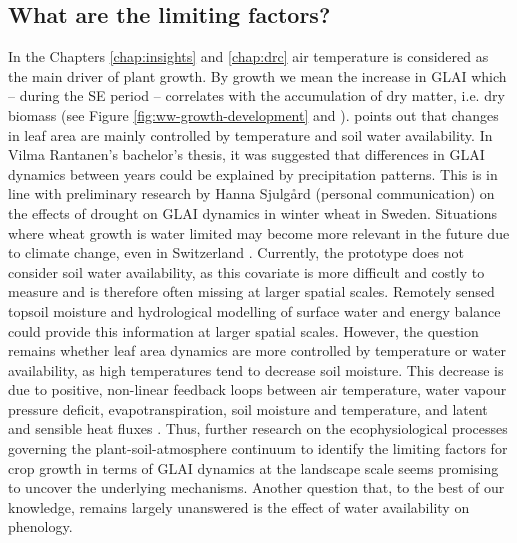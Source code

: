 \subsection{What are the limiting factors?}
In the Chapters \ref{chap:insights} and \ref{chap:drc} air temperature is considered as the main driver of plant growth. By growth we mean the increase in \gls{GLAI} which -- during the \gls{SE} period -- correlates with the accumulation of dry matter, i.e. dry biomass (see Figure \ref{fig:ww-growth-development} and \cite{aase_relationship_1978}). \cite{monteith_climate_1977} points out that changes in leaf area are mainly controlled by temperature and soil water availability. In Vilma Rantanen's bachelor's thesis, it was suggested that differences in \gls{GLAI} dynamics between years could be explained by precipitation patterns. This is in line with preliminary research by Hanna Sjulgård (personal communication) on the effects of drought on \gls{GLAI} dynamics in winter wheat in Sweden. Situations where wheat growth is water limited may become more relevant in the future due to climate change, even in Switzerland \citep{holzkamper_spatial_2015}. Currently, the prototype does not consider soil water availability, as this covariate is more difficult and costly to measure and is therefore often missing at larger spatial scales. Remotely sensed topsoil moisture \citep{lobell_moisture_2002, sadeghi_optical_2017} and hydrological modelling of surface water and energy balance \citep{penman_natural_1948, priestley_assessment_1972, shuttleworth_simplified_1978} could provide this information at larger spatial scales. However, the question remains whether leaf area dynamics are more controlled by temperature or water availability, as high temperatures tend to decrease soil moisture. This decrease is due to positive, non-linear feedback loops between air temperature, water vapour pressure deficit, evapotranspiration, soil moisture and temperature, and latent and sensible heat fluxes \citep{webber_diverging_2018, garcia-garcia_soil_2023}. Thus, further research on the ecophysiological processes governing the plant-soil-atmosphere continuum to identify the limiting factors for crop growth in terms of \gls{GLAI} dynamics at the landscape scale seems promising to uncover the underlying mechanisms. Another question that, to the best of our knowledge, remains largely unanswered is the effect of water availability on phenology.

